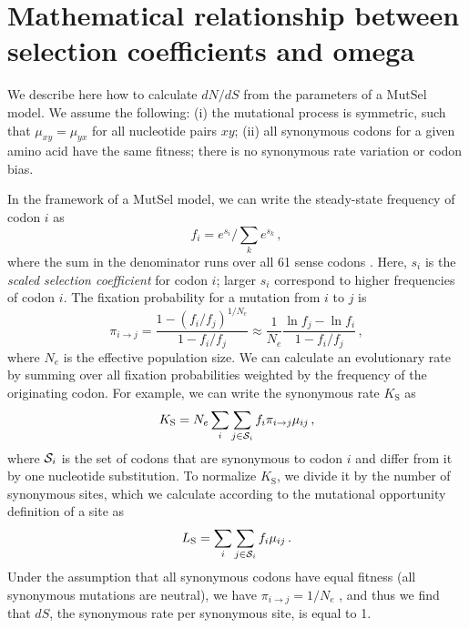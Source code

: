 \documentclass[11pt]{article}
\begin{document}
\section*{Mathematical relationship between selection coefficients and omega}


We describe here how to calculate $dN/dS$ from the parameters of a MutSel model. We assume the following: (i) the mutational process is symmetric, such that $\mu_{xy}=\mu_{yx}$ for all nucleotide pairs $xy$; (ii) all synonymous codons for a given amino acid have the same fitness; there is no synonymous rate variation or codon bias.

In the framework of a MutSel model, we can write the steady-state frequency of codon $i$ as
\begin{equation}\label{eq:fi}
 f_i=e^{s_i}\Big/\sum_k e^{s_k}\,,
\end{equation}
where the sum in the denominator runs over all 61 sense codons \cite{SellaHirsh2005}. Here, $s_i$ is the \emph{scaled selection coefficient} for codon $i$; larger $s_i$ correspond to higher frequencies of codon $i$. The fixation probability for a mutation from $i$ to $j$ is \cite{HalpernBruno1998,SellaHirsh2005}
\begin{equation}\label{eq:pi}
  \pi_{i\rightarrow j} = \frac{1-(f_i/f_j)^{1/N_e}}{1-f_i/f_j}
  \approx \frac{1}{N_e} \frac{\ln f_j - \ln f_i}{1-f_i/f_j}\,,
\end{equation}
where $N_e$ is the effective population size. We can calculate an evolutionary rate by summing over all fixation probabilities weighted by the frequency of the originating codon. For example, we can write the synonymous rate $K_\text{S}$ as
\begin{equation}\label{eq:KS}
  K_\text{S} = N_e \sum_i \sum_{j \in {\cal S}_i} f_i  \pi_{i\rightarrow j}\mu_{ij}\,,
\end{equation}
where ${\cal S}_i$ is the set of codons that are synonymous to codon $i$ and differ from it by one nucleotide substitution. To normalize $K_\text{S}$, we divide it by the number of synonymous sites, which we calculate according to the mutational opportunity definition of a site \cite{GoldmanYang1994, Yang2006} as 
\begin{equation}\label{eq:LS}
  L_\text{S} = \sum_i \sum_{j \in {\cal S}_i} f_i \mu_{ij} \,.
\end{equation}
Under the assumption that all synonymous codons have equal fitness (all synonymous mutations are neutral), we have $\pi_{i\rightarrow j}=1/N_e$ \cite{CrowKimura1970}, and thus we find that $dS$, the synonymous rate per synonymous site, is equal to 1.
\end{document}
